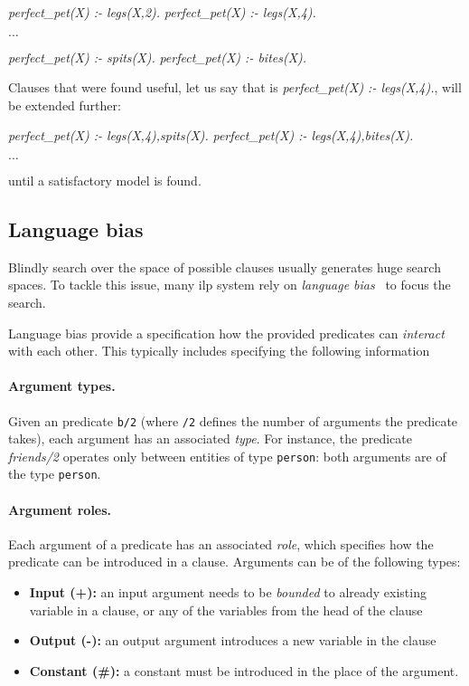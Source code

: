 \begin{center}
	\textit{perfect\_pet(X) :- legs(X,2).} \quad \textit{perfect\_pet(X) :- legs(X,4).}

	$\ldots$

	\textit{perfect\_pet(X) :- spits(X).} \quad \textit{perfect\_pet(X) :- bites(X).}
\end{center}


Clauses that were found useful, let us say that is \textit{perfect\_pet(X) :- legs(X,4).}, will be extended further:


\begin{center}
	\textit{perfect\_pet(X) :- legs(X,4),spits(X).} \quad \textit{perfect\_pet(X) :- legs(X,4),bites(X).}

	$\ldots$
\end{center}

until a satisfactory model is found.







\subsection{Language bias}
\label{ch2:languagebias}

Blindly search over the space of possible clauses usually generates huge search spaces.
To tackle this issue, many \gls{ilp} system rely on \textit{language bias}~\cite{DBLP:reference/ml/Blockeel17} to focus the search.


Language bias provide a specification how the provided predicates can \textit{interact} with each other.
This typically includes specifying the following information


\paragraph{Argument types.} Given an predicate \texttt{b/2} (where \texttt{/2} defines the number of arguments the predicate takes), each argument has an associated \textit{type}. For instance, the predicate \textit{friends/2} operates only between entities of type \texttt{person}: both arguments are of the type \texttt{person}.


\paragraph{Argument roles.} Each argument of a predicate has an associated \textit{role}, which specifies how the predicate can be introduced in a clause.
Arguments can be of the following types:
\begin{itemize}
	\item \textbf{Input (+):} an input argument needs to be \textit{bounded} to already existing variable in a clause, or any of the variables from the head of the clause
	\item \textbf{Output (-):} an output argument introduces a new variable in the clause
	\item \textbf{Constant (\#):} a constant must be introduced in the place of the argument.
\end{itemize}

